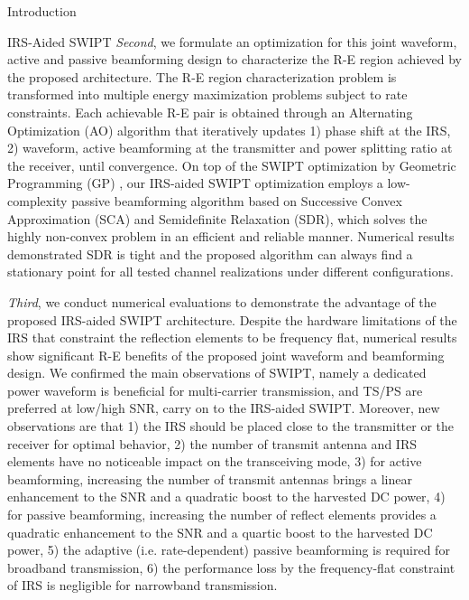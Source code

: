 \documentclass[journal]{IEEEtran}
\begin{document}
\begin{section}{Introduction}
\begin{subsection}{IRS-Aided SWIPT}
			\textit{Second}, we formulate an optimization for this joint waveform, active and passive beamforming design to characterize the R-E region achieved by the proposed architecture. The R-E region characterization problem is transformed into multiple energy maximization problems subject to rate constraints. Each achievable R-E pair is obtained through an Alternating Optimization (AO) algorithm that iteratively updates 1) phase shift at the IRS, 2) waveform, active beamforming at the transmitter and power splitting ratio at the receiver, until convergence. On top of the SWIPT optimization by Geometric Programming (GP) \cite{Clerckx2018b}, our IRS-aided SWIPT optimization employs a low-complexity passive beamforming algorithm based on Successive Convex Approximation (SCA) and Semidefinite Relaxation (SDR), which solves the highly non-convex problem in an efficient and reliable manner. Numerical results demonstrated SDR is tight and the proposed algorithm can always find a stationary point for all tested channel realizations under different configurations.

			\textit{Third}, we conduct numerical evaluations to demonstrate the advantage of the proposed IRS-aided SWIPT architecture.
			Despite the hardware limitations of the IRS that constraint the reflection elements to be frequency flat, numerical results show significant R-E benefits of the proposed joint waveform and beamforming design. We confirmed the main observations of SWIPT, namely a dedicated power waveform is beneficial for multi-carrier transmission, and TS/PS are preferred at low/high SNR, carry on to the IRS-aided SWIPT. Moreover, new observations are that 1) the IRS should be placed close to the transmitter or the receiver for optimal behavior, 2) the number of transmit antenna and IRS elements have no noticeable impact on the transceiving mode, 3) for active beamforming, increasing the number of transmit antennas brings a linear enhancement to the SNR and a quadratic boost to the harvested DC power, 4) for passive beamforming, increasing the number of reflect elements provides a quadratic enhancement to the SNR and a quartic boost to the harvested DC power, 5) the adaptive (i.e. rate-dependent) passive beamforming is required for broadband transmission, 6) the performance loss by the frequency-flat constraint of IRS is negligible for narrowband transmission.


\end{subsection}
\end{section}
\end{document}

